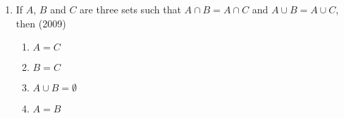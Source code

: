 \documentclass[journal]{IEEEtran}
\begin{document}
\begin{enumerate}
    \item If $A$, $B$ and $C$ are three sets such that $A \cap B = A \cap C$
        and $A \cup B = A \cup C$, then
        \hfill (2009)
        
        \begin{multicols}{2}
            \begin{enumerate}
                \item $A = C$
                \item $B = C$
                \item $A \cup B = \emptyset$
                \item $A = B$
            \end{enumerate}
        \end{multicols}

\end{enumerate}
\end{document}
